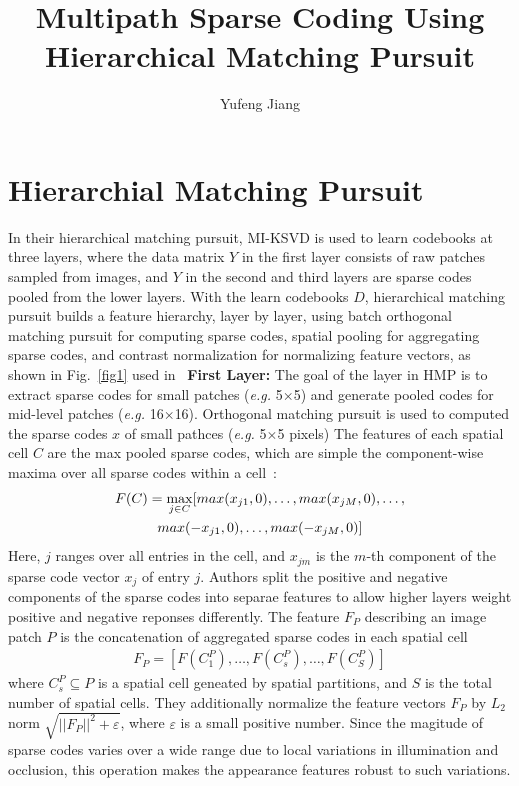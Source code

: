 \documentclass[10pt,twocolumn,letterpaper]{article}
\begin{document}
\title{Multipath Sparse Coding Using Hierarchical Matching Pursuit}
\author{Yufeng Jiang}
\maketitle

\section{Hierarchial Matching Pursuit}

In their hierarchical matching pursuit, MI-KSVD is used to learn codebooks at three layers, where the data matrix $Y$ in the first layer consists of raw patches sampled from images, and $Y$ in the second and third layers are sparse codes pooled from the lower layers. With the learn codebooks $D$, hierarchical matching pursuit builds a feature hierarchy, layer by layer, using batch orthogonal matching pursuit for computing sparse codes,  spatial pooling for aggregating sparse codes, and contrast normalization for normalizing feature vectors, as shown in Fig.~\ref{fig1} used in~\cite{multipath}
{\bf First Layer:} The goal of the layer in HMP is to extract sparse codes for small patches (\emph{e.g.} 5$\times$5) and generate pooled codes for mid-level patches (\emph{e.g.} 16$\times$16). Orthogonal matching pursuit is used to computed the sparse codes $x$ of small pathces (\emph{e.g.} 5$\times$5 pixels) The features of each spatial cell $C$ are the max pooled sparse codes, which are simple the component-wise maxima over all sparse codes within a cell~\cite{multipath}:
\begin{gather}
F(C) = \mathop{\max}\limits_{j\in C}[max(x_{j1},0),\dots,max(x_{jM},0),\dots,\\ max(-x_{j1},0),\dots,max(-x_{jM},0)]  \notag
\end{gather}
Here, $j$ ranges over all entries in the cell, and $x_{jm}$ is the $m$-th component of the sparse code vector $x_j$ of entry $j$. Authors split the positive and negative components of the sparse codes into separae features to allow higher layers weight positive and negative reponses differently. The feature $F_P$ describing an image patch $P$ is the concatenation of aggregated sparse codes in each spatial cell~\cite{multipath}
\begin{gather}
F_P = [F(C_1^P),\dots,F(C_s^P),\dots,F(C_S^P)]
\end{gather}
where $C_s^P \subseteq P$ is a spatial cell geneated by spatial partitions, and $S$ is the total number of spatial cells. They additionally normalize the feature vectors $F_P$ by $L_2$ norm $\sqrt{||F_P||^2 + \varepsilon}$, where $\varepsilon$ is a small positive number. Since the magitude of sparse codes varies over a wide range due to local variations in illumination and occlusion, this operation makes the appearance features robust to such variations.\\
\end{document}
